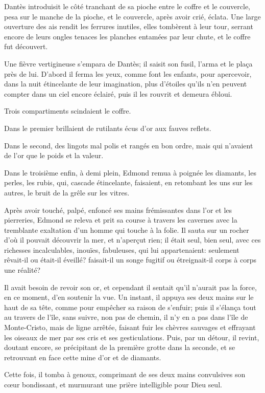 Dantès introduisit le côté tranchant de sa pioche entre le coffre et le couvercle, pesa sur le manche de la pioche, et le couvercle, après avoir crié, éclata. Une large ouverture des ais rendit les ferrures inutiles, elles tombèrent à leur tour, serrant encore de leurs ongles tenaces les planches entamées par leur chute, et le coffre fut découvert.

Une fièvre vertigineuse s'empara de Dantès; il saisit son fusil, l'arma et le plaça près de lui. D'abord il ferma les yeux, comme font les enfants, pour apercevoir, dans la nuit étincelante de leur imagination, plus d'étoiles qu'ils n'en peuvent compter dans un ciel encore éclairé, puis il les rouvrit et demeura ébloui.

Trois compartiments scindaient le coffre.

Dans le premier brillaient de rutilants écus d'or aux fauves reflets.

Dans le second, des lingots mal polis et rangés en bon ordre, mais qui n'avaient de l'or que le poids et la valeur.

Dans le troisième enfin, à demi plein, Edmond remua à poignée les diamants, les perles, les rubis, qui, cascade étincelante, faisaient, en retombant les uns sur les autres, le bruit de la grêle sur les vitres.

Après avoir touché, palpé, enfoncé ses mains frémissantes dans l'or et les pierreries, Edmond se releva et prit sa course à travers les cavernes avec la tremblante exaltation d'un homme qui touche à la folie. Il sauta sur un rocher d'où il pouvait découvrir la mer, et n'aperçut rien; il était seul, bien seul, avec ces richesses incalculables, inouïes, fabuleuses, qui lui appartenaient: seulement rêvait-il ou était-il éveillé? faisait-il un songe fugitif ou étreignait-il corps à corps une réalité?

Il avait besoin de revoir son or, et cependant il sentait qu'il n'aurait pas la force, en ce moment, d'en soutenir la vue. Un instant, il appuya ses deux mains sur le haut de sa tête, comme pour empêcher sa raison de s'enfuir; puis il s'élança tout au travers de l'île, sans suivre, non pas de chemin, il n'y en a pas dans l'île de Monte-Cristo, mais de ligne arrêtée, faisant fuir les chèvres sauvages et effrayant les oiseaux de mer par ses cris et ses gesticulations. Puis, par un détour, il revint, doutant encore, se précipitant de la première grotte dans la seconde, et se retrouvant en face cette mine d'or et de diamants.

Cette fois, il tomba à genoux, comprimant de ses deux mains convulsives son cœur bondissant, et murmurant une prière intelligible pour Dieu seul.

